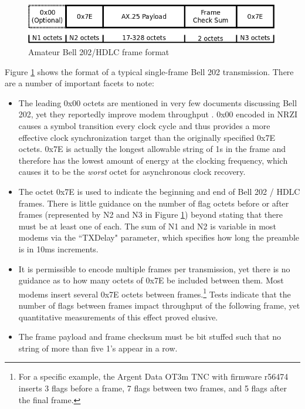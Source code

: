 \documentclass[12pt,letterpaper]{article}
\begin{document}
\begin{figure}
	\centering
	\includegraphics[width=1.0\textwidth]{src/dia/bell202}
	\caption{Amateur Bell 202/HDLC frame format}
	\label{fig:bell202format}
\end{figure}

Figure \ref{fig:bell202format} shows the format of a typical single-frame
Bell 202 transmission. There are a number of important facets to note:
\begin{itemize}
	\item The leading 0x00 octets are mentioned in very few documents
		discussing Bell 202, yet they reportedly improve modem
		throughput \cite{millerinterview}\cite{aprsunveiled}. 
		0x00 encoded in NRZI causes a symbol transition
		every clock cycle and thus provides a more effective clock 
		synchronization target than the originally specified 0x7E octets. 
		0x7E is actually 
		the longest allowable string of 1s in the frame and 
		therefore has the lowest amount of energy at the clocking frequency,
		which causes it to be the \emph{worst} 
		octet for asynchronous clock recovery.
	\item The octet 0x7E is used to indicate the beginning and end of 
		Bell 202 / HDLC frames.
		There is little guidance on the number of flag octets before
		or after frames (represented by N2 and N3 in 
		Figure \ref{fig:bell202format})
		beyond stating that there must be at least one of each. The sum of
		N1 and N2 is variable in most modems via the ``TXDelay" parameter,
		which specifies how long the preamble is in 10ms increments.
	\item It is permissible to encode multiple 
		frames per transmission, yet there is no guidance as to how
		many octets of 0x7E be included between them.
		Most modems insert several 0x7E octets between 
		frames.\footnote{For a specific example, the Argent Data OT3m TNC 
			with firmware r56474 inserts 3 flags before
		a frame, 7 flags between two frames, and 5 flags after the final frame.}
		Tests indicate that the number of flags between frames 
		impact throughput of the following frame, yet
		quantitative measurements of this effect proved elusive.
	\item The frame payload and frame checksum must be bit stuffed such 
		that no string of more than five 1's appear in a row.

\end{itemize}
\end{document}
